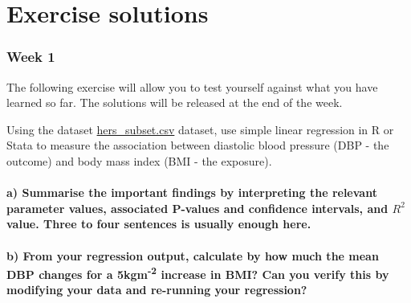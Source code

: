 \documentclass[
  letterpaper,
  DIV=11,
  numbers=noendperiod]{scrreprt}
\author{}
\date{}
\begin{document}
\chapter{Exercise solutions}\label{exercise-solutions}

\subsection*{Week 1}\label{week-1}

The following exercise will allow you to test yourself against what you
have learned so far. The solutions will be released at the end of the
week.

Using the dataset
\href{https://raw.githubusercontent.com/atpinto/RM1/refs/heads/main/Data/hers_subset.csv}{hers\_subset.csv}
dataset, use simple linear regression in R or Stata to measure the
association between diastolic blood pressure (DBP - the outcome) and
body mass index (BMI - the exposure).

\subsubsection{\texorpdfstring{a) Summarise the important findings by
interpreting the relevant parameter values, associated P-values and
confidence intervals, and \(R^2\) value. Three to four sentences is
usually enough
here.}{a) Summarise the important findings by interpreting the relevant parameter values, associated P-values and confidence intervals, and R\^{}2 value. Three to four sentences is usually enough here.}}\label{a-summarise-the-important-findings-by-interpreting-the-relevant-parameter-values-associated-p-values-and-confidence-intervals-and-r2-value.-three-to-four-sentences-is-usually-enough-here.}

\subsubsection*{\texorpdfstring{b) From your regression output,
calculate by how much the mean DBP changes for a
5kgm\textsuperscript{-2} increase in BMI? Can you verify this by
modifying your data and re-running your
regression?}{b) From your regression output, calculate by how much the mean DBP changes for a 5kgm-2 increase in BMI? Can you verify this by modifying your data and re-running your regression?}}\label{b-from-your-regression-output-calculate-by-how-much-the-mean-dbp-changes-for-a-5kgm-2-increase-in-bmi-can-you-verify-this-by-modifying-your-data-and-re-running-your-regression}
\end{document}
